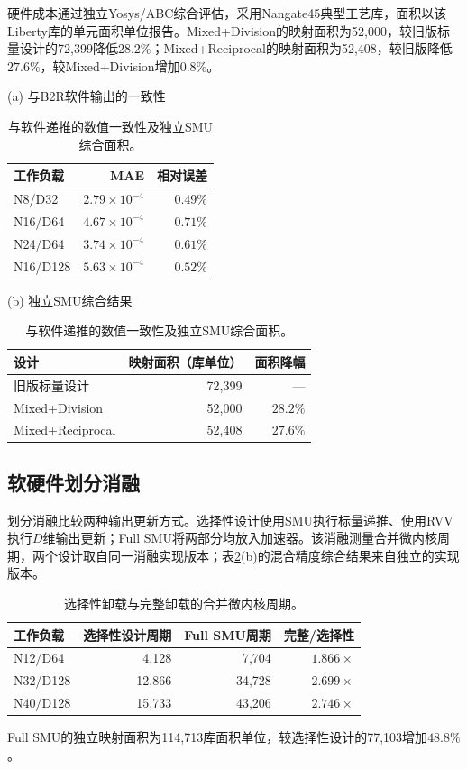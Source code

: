 \documentclass[journal]{IEEEtran}
\begin{document}
硬件成本通过独立Yosys/ABC综合评估，采用Nangate45典型工艺库，面积以该Liberty库的单元面积单位报告。Mixed+Division的映射面积为52,000，较旧版标量设计的72,399降低$28.2\%$；Mixed+Reciprocal的映射面积为52,408，较旧版降低$27.6\%$，较Mixed+Division增加$0.8\%$。
\begin{table}[t]\centering\small
\caption{与软件递推的数值一致性及独立SMU综合面积。}
\label{tab:accuracy}
(a) 与B2R软件输出的一致性\par\medskip
\begin{tabular}{lrr}
\toprule
工作负载 & MAE & 相对误差\\
\midrule
N8/D32 & $2.79\times10^{-4}$ & $0.49\%$\\
N16/D64 & $4.67\times10^{-4}$ & $0.71\%$\\
N24/D64 & $3.74\times10^{-4}$ & $0.61\%$\\
N16/D128 & $5.63\times10^{-4}$ & $0.52\%$\\
\bottomrule
\end{tabular}\par\medskip
(b) 独立SMU综合结果\par\medskip
\begin{tabular}{lrr}
\toprule
设计 & 映射面积（库单位） & 面积降幅\\
\midrule
旧版标量设计 & 72,399 & ---\\
Mixed+Division & 52,000 & $28.2\%$\\
Mixed+Reciprocal & 52,408 & $27.6\%$\\
\bottomrule
\end{tabular}
\end{table}

\subsection{软硬件划分消融}
划分消融比较两种输出更新方式。选择性设计使用SMU执行标量递推、使用RVV执行$D$维输出更新；Full SMU将两部分均放入加速器。该消融测量合并微内核周期，两个设计取自同一消融实现版本；表\ref{tab:accuracy}(b)的混合精度综合结果来自独立的实现版本。
\begin{table}[t]\centering
\caption{选择性卸载与完整卸载的合并微内核周期。}
\label{tab:ablation}
\begin{tabular}{lrrr}
\toprule
工作负载 & 选择性设计周期 & Full SMU周期 & 完整/选择性\\
\midrule
N12/D64 & 4,128 & 7,704 & $1.866\times$\\
N32/D128 & 12,866 & 34,728 & $2.699\times$\\
N40/D128 & 15,733 & 43,206 & $2.746\times$\\
\bottomrule
\end{tabular}
\end{table}
Full SMU的独立映射面积为114,713库面积单位，较选择性设计的77,103增加$48.8\%$。
\end{document}

